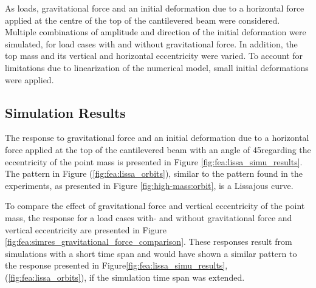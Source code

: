 \documentclass{article}
\begin{document}
As loads, gravitational force and an initial deformation due to a horizontal force applied at the centre of the top of the cantilevered beam were considered. Multiple combinations of amplitude and direction of the initial deformation were simulated, for load cases with and without gravitational force. In addition, the top mass and its vertical and horizontal eccentricity were varied.  To account for limitations due to linearization of the numerical model, small initial deformations were applied.

\subsection{Simulation Results}

The response to gravitational force and an initial deformation due to a horizontal force applied at the top of the  cantilevered beam with an angle of 45\textdegree regarding the eccentricity of the point mass is presented in Figure \autoref{fig:fea:lissa_simu_results}. The pattern in Figure  (\autoref{fig:fea:lissa_orbits}),  similar to the pattern found in the experiments, as presented in Figure \autoref{fig:high-mass:orbit}, is a Lissajous curve. 

To compare the effect of gravitational force and vertical eccentricity of the point mass, the response  for a load cases with- and without gravitational force and vertical eccentricity are presented in Figure \autoref{fig:fea:simres_gravitational_force_comparison}. These responses result from simulations with a short time span and would have shown a similar pattern to the response presented in Figure\autoref{fig:fea:lissa_simu_results}, (\autoref{fig:fea:lissa_orbits}), if the simulation time span was extended. 
\end{document}

